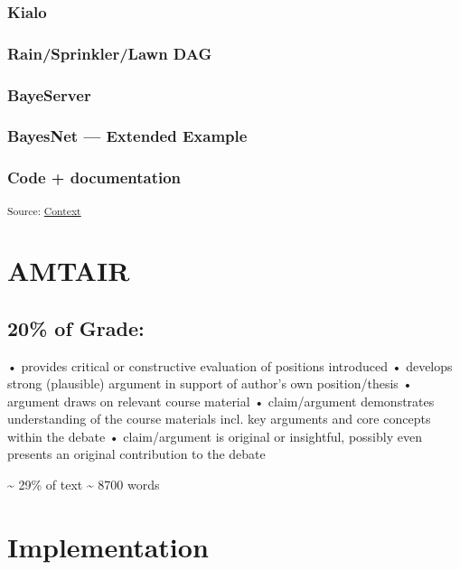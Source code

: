\documentclass[12pt,a4paper]{report}      %
\begin{document}
\subsection{Kialo}\label{kialo}

\subsection{Rain/Sprinkler/Lawn DAG}\label{rainsprinklerlawn-dag}

\subsection{BayeServer}\label{bayeserver}

\subsection{BayesNet --- Extended
Example}\label{bayesnet-extended-example}

\subsection{Code + documentation}\label{code-documentation}

\textsubscript{Source:
\href{https://VJMeyer.github.io/submission/chapters/Context.qmd.html\#c72e7a53-afa2-42e6-8531-cb6abbeedfdb}{Context}}

\chapter{AMTAIR}\label{amtair}

\section{20\% of Grade:}\label{of-grade-1}

• provides critical or constructive evaluation of positions introduced •
develops strong (plausible) argument in support of author's own
position/thesis • argument draws on relevant course material •
claim/argument demonstrates understanding of the course materials incl.
key arguments and core concepts within the debate • claim/argument is
original or insightful, possibly even presents an original contribution
to the debate

\textasciitilde{} 29\% of text \textasciitilde{} 8700 words

\chapter{Implementation}\label{implementation}
\end{document}
